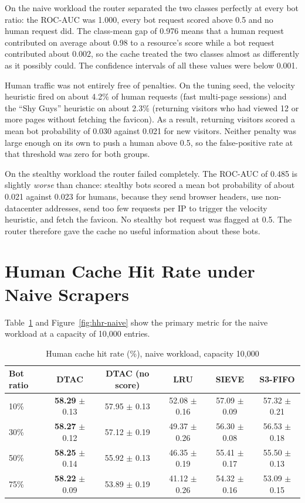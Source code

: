 On the naive workload the router separated the two classes perfectly at every bot ratio: the ROC-AUC was 1.000, every bot request scored above 0.5 and no human request did. The class-mean gap of 0.976 means that a human request contributed on average about 0.98 to a resource's score while a bot request contributed about 0.002, so the cache treated the two classes almost as differently as it possibly could. The confidence intervals of all these values were below 0.001.

Human traffic was not entirely free of penalties. On the tuning seed, the velocity heuristic fired on about 4.2\% of human requests (fast multi-page sessions) and the ``Shy Guys'' heuristic on about 2.3\% (returning visitors who had viewed 12 or more pages without fetching the favicon). As a result, returning visitors scored a mean bot probability of 0.030 against 0.021 for new visitors. Neither penalty was large enough on its own to push a human above 0.5, so the false-positive rate at that threshold was zero for both groups.

On the stealthy workload the router failed completely. The ROC-AUC of 0.485 is slightly \emph{worse} than chance: stealthy bots scored a mean bot probability of about 0.021 against 0.023 for humans, because they send browser headers, use non-datacenter addresses, send too few requests per IP to trigger the velocity heuristic, and fetch the favicon. No stealthy bot request was flagged at 0.5. The router therefore gave the cache no useful information about these bots.

\section{Human Cache Hit Rate under Naive Scrapers}
Table~\ref{tab:hhr-naive} and Figure~\ref{fig:hhr-naive} show the primary metric for the naive workload at a capacity of 10{,}000 entries.

\begin{table}[htbp]
    \centering
    \caption{Human cache hit rate (\%), naive workload, capacity 10{,}000}
    \label{tab:hhr-naive}
    \small
    \begin{tabular}{lccccc}
        \toprule
        Bot ratio & DTAC & DTAC (no score) & LRU & SIEVE & S3-FIFO \\
        \midrule
        10\% & \textbf{58.29} $\pm$ 0.13 & 57.95 $\pm$ 0.13 & 52.08 $\pm$ 0.16 & 57.09 $\pm$ 0.09 & 57.32 $\pm$ 0.21 \\
        30\% & \textbf{58.27} $\pm$ 0.12 & 57.12 $\pm$ 0.19 & 49.37 $\pm$ 0.26 & 56.30 $\pm$ 0.08 & 56.53 $\pm$ 0.18 \\
        50\% & \textbf{58.25} $\pm$ 0.14 & 55.92 $\pm$ 0.13 & 46.35 $\pm$ 0.19 & 55.41 $\pm$ 0.17 & 55.50 $\pm$ 0.13 \\
        75\% & \textbf{58.22} $\pm$ 0.09 & 53.89 $\pm$ 0.19 & 41.12 $\pm$ 0.26 & 54.32 $\pm$ 0.16 & 53.09 $\pm$ 0.15 \\
        \bottomrule
    \end{tabular}
\end{table}


